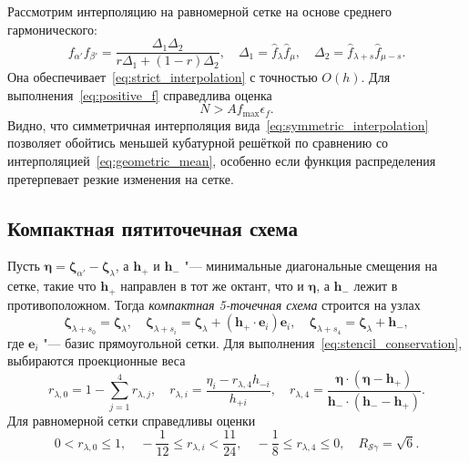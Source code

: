 \documentclass[a4paper,12pt]{article}
\newcommand{\bzeta}{\boldsymbol{\zeta}}
\newcommand{\bh}{\boldsymbol{h}}
\newcommand{\be}{\boldsymbol{e}}
\newcommand{\OO}[1]{O(#1)}
\begin{document}
Рассмотрим интерполяцию на равномерной сетке на основе среднего гармонического:
\begin{equation}\label{eq:symmetric_interpolation}
    f_{\alpha'}f_{\beta'} = \frac{\Delta_1\Delta_2}{r\Delta_1+(1-r)\Delta_2}, \quad
    \Delta_1 = \hat{f}_\lambda \hat{f}_\mu, \quad
    \Delta_2 = \hat{f}_{\lambda+s}\hat{f}_{\mu-s}.
\end{equation}
Она обеспечивает~\eqref{eq:strict_interpolation} с точностью \(\OO{h}\).
Для выполнения~\eqref{eq:positive_f} справедлива оценка
\begin{equation}\label{eq:positive_f_symmetric}
    N > A f_{\max} \epsilon_f.
\end{equation}
Видно, что симметричная интерполяция вида~\eqref{eq:symmetric_interpolation} позволяет обойтись меньшей кубатурной решёткой
по сравнению со интерполяцией~\eqref{eq:geometric_mean}, особенно если функция распределения претерпевает
резкие изменения на сетке.

\subsection{Компактная пятиточечная схема}

Пусть \(\boldsymbol{\eta} = \bzeta_{\alpha'} - \bzeta_{\lambda}\),
а \(\bh_+\) и \(\bh_-\) "--- минимальные диагональные смещения на сетке,
такие что \(\bh_+\) направлен в тот же октант, что и \(\boldsymbol{\eta}\),
а \(\bh_-\) лежит в противоположном.
Тогда \emph{компактная 5-точечная схема} строится на узлах
\begin{equation}\label{eq:stencil_nodes5}
    \bzeta_{\lambda+s_0} = \bzeta_{\lambda}, \quad
    \bzeta_{\lambda+s_i} = \bzeta_{\lambda} + (\bh_+\cdot \be_i)\be_i, \quad
    \bzeta_{\lambda+s_4} = \bzeta_{\lambda} + \bh_-,
\end{equation}
где \(\be_i\) "--- базис прямоугольной сетки.
Для выполнения~\eqref{eq:stencil_conservation}, выбираются проекционные веса
\begin{equation}\label{eq:stencil_weights5}
    r_{\lambda,0} = 1 - \sum_{j=1}^4 r_{\lambda,j}, \quad
    r_{\lambda,i} = \frac{\eta_i - r_{\lambda,4}h_{-i}}{h_{+i}}, \quad
    r_{\lambda,4} = \frac{\boldsymbol{\eta}\cdot(\boldsymbol{\eta} - \bh_+)}
        {\bh_-\cdot(\bh_- - \bh_+)}.
\end{equation}
Для равномерной сетки справедливы оценки
\begin{equation}\label{eq:weights_ranges5}
    0 < r_{\lambda,0} \leq 1, \quad
    -\frac1{12} \leq r_{\lambda,i} < \frac{11}{24}, \quad
    -\frac18 \leq r_{\lambda,4} \leq 0, \quad
    R_{\mathcal{S}\gamma} = \sqrt{6}.
\end{equation}
\end{document}
